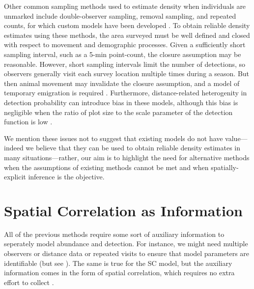 Other common sampling methods used to estimate density when individuals are
unmarked include double-observer sampling, removal sampling, and
repeated counts, for which custom models have been developed
\citep{nichols_etal:2000, farnsworth_etal:2002, royle:2004biom,
  royle:2004abc,fiske_chandler:2011}. To
obtain reliable density estimates using these
methods, the area surveyed must be well defined and closed with
respect to movement and demographic processes. Given a sufficiently short
sampling interval, such as a 5-min point-count, the closure
assumption may be reasonable. However, short sampling intervals limit
the number of detections, so observers generally visit each survey
location multiple times during a season. But then animal
movement may invalidate the closure assumption, and a model of
temporary emigration is required
\citep{kendall_etal:1997,chandler_etal:2011}. Furthermore,
distance-related heterogenity in detection probability can introduce
bias in these models, although this bias is negligible when the
ratio of plot size to the scale parameter of the detection function is low
\citep{efford_dawson:2009}.

We mention these issues not to suggest that existing models do not
have value---indeed we believe that they can be used to obtain
reliable density estimates in many situations---rather, our aim is to
highlight the need for alternative methods when the assumptions of
existing methods cannot be met and when spatially-explicit inference
is the objective. %


\section{Spatial Correlation as Information}
\label{sect.corr-info}

All of the previous methods require some sort of auxiliary information
to seperately model abundance and detection. For instance, we might
need multiple observers or distance data or repeated visits to ensure
that model parameters are identifiable (but see
  \citep{lele_etal:2012, solymos_etal:2012}). The same is true for
the SC model, but the auxiliary information comes in the form of spatial
correlation, which requires no extra effort to collect
\citep{chandler_royle:2012}. %

